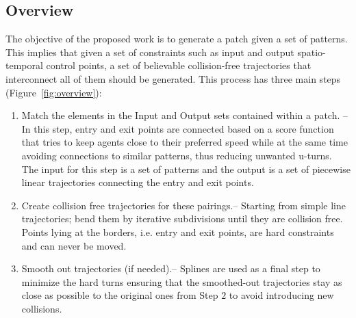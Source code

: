 \subsection{Overview}
\label{sec:method:overview}

The objective of the proposed work is to generate a patch given a set of patterns.
This implies that given a set of constraints such as input and output spatio-temporal control points, a set of believable collision-free trajectories that interconnect all of them should be generated.
This process has three main steps (Figure~\ref{fig:overview}):
\begin{enumerate}
  \item Match the elements in the Input and Output sets contained within a patch. {--}
  In this step, entry and exit points are connected based on a score function that tries to keep agents close to their preferred speed while at the same time avoiding connections to similar patterns, thus reducing unwanted u-turns.
  The input for this step is a set of patterns and the output is a set of piecewise linear trajectories connecting the entry and exit points.
  \item Create collision free trajectories for these pairings.{--}
  Starting from simple line trajectories; bend them by iterative subdivisions until they are collision free.
  Points lying at the borders, i.e. entry and exit points, are hard constraints and can never be moved.
  \item Smooth out trajectories (if needed).{--}
   Splines are used as a final step to minimize the hard turns ensuring that the smoothed-out trajectories stay as close as possible to the original ones from Step $2$ to avoid introducing new collisions.
\end{enumerate}

% 
% 
%       

